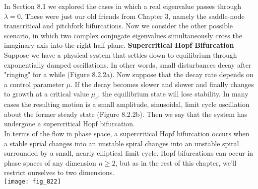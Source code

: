 \documentclass{article}
\newcommand\tab[1][1cm]{\hspace*{#1}}
\begin{document}
\tab In Section 8.1 we explored the cases in which a real eigenvalue passes through $\lambda=0$. These were just our old friends from Chapter 3, namely the saddle-node transcritical and pitchfork bifurcations. Now we consider the other possible scenario, in which two complex conjugate eigenvalues simultaneously cross the imaginary axis into the right half plane. 
\textbf {Supercritical Hopf Bifurcation} \\ \tab
Suppose we have a physical system that settles down to equilibrium through exponentially damped oscillations. In other words, small disturbances decay after "ringing" for a while (Figure 8.2.2a). Now suppose that the decay rate depends on a control parameter $\mu$. If the decay becomes slower and slower and finally changes to growth at a critical value $\mu_{c}$, the equilibrium state will lose stability. In many cases the resulting motion is a small amplitude, sinusoidal, limit cycle oscillation about the former steady state (Figure 8.2.2b). Then we say that the system has undergone a supercritical Hopf bifurcation. \\ In terms of the flow in phase space, a supercritical Hopf bifurcation occurs when a stable sprial changes into an unstable spiral changes into an unstable spiral surrounded by a small, nearly elliptical limit cycle. Hopf bifurcations can occur in phase spaces of any dimension $n \geq 2$, but as in the rest of this chapter, we'll restrict ourselves to two dimensions. \\
\texttt{[image: fig\_822]}
\end{document}
